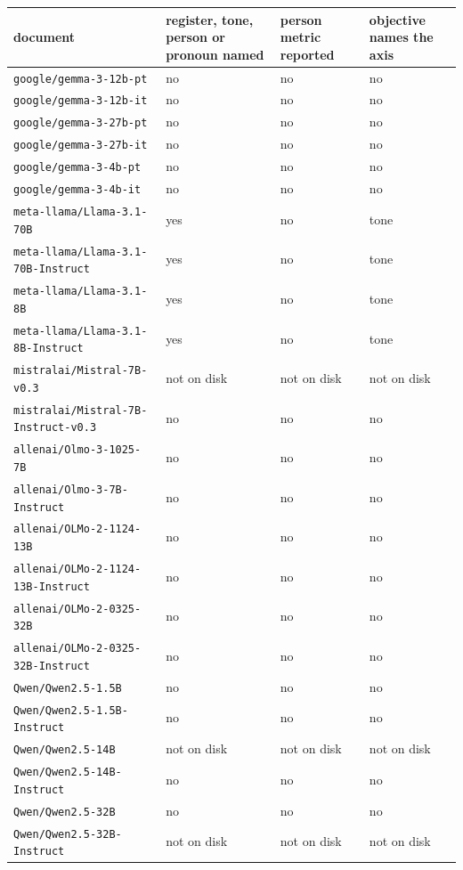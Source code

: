 \begin{center}\scriptsize\setlength{\tabcolsep}{3pt}
\begin{tabular}{llp{4.1cm}l}\toprule
document & register, tone, person or pronoun named & person metric reported & objective names the axis \\ \midrule
\texttt{google/gemma-3-12b-pt} & no & no & no \\
\texttt{google/gemma-3-12b-it} & no & no & no \\
\texttt{google/gemma-3-27b-pt} & no & no & no \\
\texttt{google/gemma-3-27b-it} & no & no & no \\
\texttt{google/gemma-3-4b-pt} & no & no & no \\
\texttt{google/gemma-3-4b-it} & no & no & no \\
\texttt{meta-llama/Llama-3.1-70B} & yes & no & tone \\
\texttt{meta-llama/Llama-3.1-70B-Instruct} & yes & no & tone \\
\texttt{meta-llama/Llama-3.1-8B} & yes & no & tone \\
\texttt{meta-llama/Llama-3.1-8B-Instruct} & yes & no & tone \\
\texttt{mistralai/Mistral-7B-v0.3} & not on disk & not on disk & not on disk \\
\texttt{mistralai/Mistral-7B-Instruct-v0.3} & no & no & no \\
\texttt{allenai/Olmo-3-1025-7B} & no & no & no \\
\texttt{allenai/Olmo-3-7B-Instruct} & no & no & no \\
\texttt{allenai/OLMo-2-1124-13B} & no & no & no \\
\texttt{allenai/OLMo-2-1124-13B-Instruct} & no & no & no \\
\texttt{allenai/OLMo-2-0325-32B} & no & no & no \\
\texttt{allenai/OLMo-2-0325-32B-Instruct} & no & no & no \\
\texttt{Qwen/Qwen2.5-1.5B} & no & no & no \\
\texttt{Qwen/Qwen2.5-1.5B-Instruct} & no & no & no \\
\texttt{Qwen/Qwen2.5-14B} & not on disk & not on disk & not on disk \\
\texttt{Qwen/Qwen2.5-14B-Instruct} & no & no & no \\
\texttt{Qwen/Qwen2.5-32B} & no & no & no \\
\texttt{Qwen/Qwen2.5-32B-Instruct} & not on disk & not on disk & not on disk \\

\end{tabular}
\end{center}

